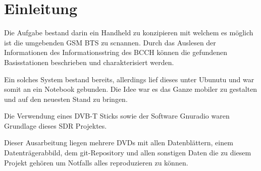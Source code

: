 %
%
\chapter{Einleitung}
Die Aufgabe bestand darin ein Handheld zu konzipieren mit welchem es möglich ist die umgebenden \ac{GSM} \ac{BTS} zu scnannen. Durch das Auslesen der Informationen des Informationsstring des  \ac{BCCH} können die gefundenen Basisstationen beschrieben und charakterisiert werden.

Ein solches System bestand bereits, allerdings lief dieses unter Ubunutu und war somit an ein Notebook gebunden. Die Idee war es das Ganze mobiler zu gestalten und auf den neuesten Stand zu bringen. 

Die Verwendung eines DVB-T Sticks sowie der Software Gnuradio waren Grundlage dieses \ac{SDR} Projektes.

Dieser Ausarbeitung liegen mehrere DVDs mit allen Datenblättern, einem Datenträgerabbild, dem git-Repository und allen sonstigen Daten die zu diesem Projekt gehören um Notfalls alles reproduzieren zu können. 

